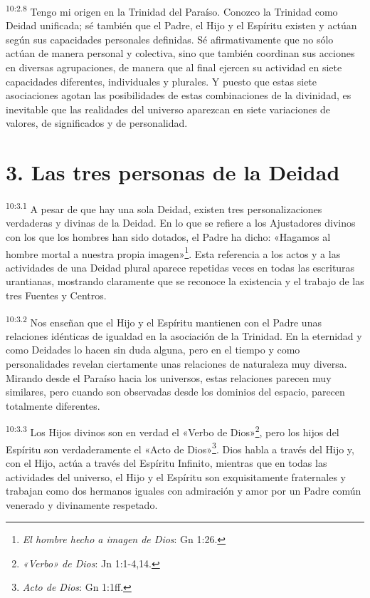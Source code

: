 \par
\textsuperscript{10:2.8} Tengo mi origen en la Trinidad del Paraíso. Conozco la Trinidad como Deidad unificada; sé también que el Padre, el Hijo y el Espíritu existen y actúan según sus capacidades personales definidas. Sé afirmativamente que no sólo actúan de manera personal y colectiva, sino que también coordinan sus acciones en diversas agrupaciones, de manera que al final ejercen su actividad en siete capacidades diferentes, individuales y plurales. Y puesto que estas siete asociaciones agotan las posibilidades de estas combinaciones de la divinidad, es inevitable que las realidades del universo aparezcan en siete variaciones de valores, de significados y de personalidad.

\section*{3. Las tres personas de la Deidad}
\par
\textsuperscript{10:3.1} A pesar de que hay una sola Deidad, existen tres personalizaciones verdaderas y divinas de la Deidad. En lo que se refiere a los Ajustadores divinos con los que los hombres han sido dotados, el Padre ha dicho: «Hagamos al hombre mortal a nuestra propia imagen»\footnote{\textit{El hombre hecho a imagen de Dios}: Gn 1:26.}. Esta referencia a los actos y a las actividades de una Deidad plural aparece repetidas veces en todas las escrituras urantianas, mostrando claramente que se reconoce la existencia y el trabajo de las tres Fuentes y Centros.

\par
\textsuperscript{10:3.2} Nos enseñan que el Hijo y el Espíritu mantienen con el Padre unas relaciones idénticas de igualdad en la asociación de la Trinidad. En la eternidad y como Deidades lo hacen sin duda alguna, pero en el tiempo y como personalidades revelan ciertamente unas relaciones de naturaleza muy diversa. Mirando desde el Paraíso hacia los universos, estas relaciones parecen muy similares, pero cuando son observadas desde los dominios del espacio, parecen totalmente diferentes.

\par
\textsuperscript{10:3.3} Los Hijos divinos son en verdad el «Verbo de Dios»\footnote{\textit{«Verbo» de Dios}: Jn 1:1-4,14.}, pero los hijos del Espíritu son verdaderamente el «Acto de Dios»\footnote{\textit{Acto de Dios}: Gn 1:1ff.}. Dios habla a través del Hijo y, con el Hijo, actúa a través del Espíritu Infinito, mientras que en todas las actividades del universo, el Hijo y el Espíritu son exquisitamente fraternales y trabajan como dos hermanos iguales con admiración y amor por un Padre común venerado y divinamente respetado.

